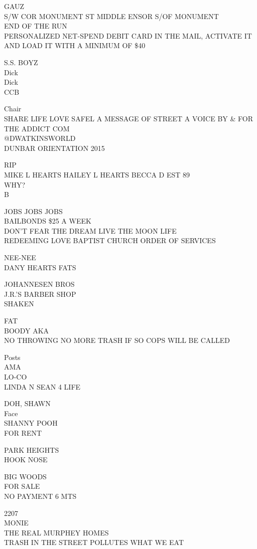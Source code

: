 \documentclass[10pt,letterpaper]{article}
\begin{document}
GAUZ\\
S/W COR MONUMENT ST MIDDLE ENSOR S/OF MONUMENT\\
END OF THE RUN\\
PERSONALIZED NET{-}SPEND DEBIT CARD IN THE MAIL, ACTIVATE IT AND LOAD IT WITH A MINIMUM OF \$40

S.S. BOYZ\\
Dick\\
Dick\\
CCB

Chair\\
SHARE LIFE LOVE SAFEL A MESSAGE OF STREET A VOICE BY \& FOR THE ADDICT COM\\
@DWATKINSWORLD\\
DUNBAR ORIENTATION 2015

RIP\\
MIKE L HEARTS HAILEY L HEARTS BECCA D EST 89\\
WHY?\\
B

JOBS JOBS JOBS\\
BAILBONDS \$25 A WEEK\\
DON'T FEAR THE DREAM LIVE THE MOON LIFE\\
REDEEMING LOVE BAPTIST CHURCH ORDER OF SERVICES

NEE{-}NEE\\
DANY HEARTS FATS

JOHANNESEN BROS\\
J.R.'S BARBER SHOP\\
SHAKEN

FAT\\
BOODY AKA\\
NO THROWING NO MORE TRASH IF SO COPS WILL BE CALLED

Posts\\
AMA\\
LO{-}CO\\
LINDA N SEAN 4 LIFE

DOH, SHAWN\\
Face\\
SHANNY POOH\\
FOR RENT

PARK HEIGHTS\\
HOOK NOSE

BIG WOODS\\
FOR SALE\\
NO PAYMENT 6 MTS

2207\\
MONIE\\
THE REAL MURPHEY HOMES\\
TRASH IN THE STREET POLLUTES WHAT WE EAT
\end{document}
